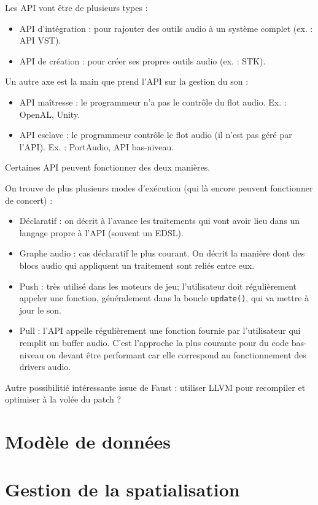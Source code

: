 \documentclass[french,12pt,a4paper]{article}
\begin{document}
Les API vont être de plusieurs types : 
\begin{itemize}
\item API d'intégration : pour rajouter des outils audio à un système complet (ex. : API VST).
\item API de création : pour créer ses propres outils audio (ex. : STK).
\end{itemize}

Un autre axe est la main que prend l'API sur la gestion du son : 
\begin{itemize}
\item API maîtresse : le programmeur n'a pas le contrôle du flot audio. Ex. : OpenAL, Unity.
\item API esclave : le programmeur contrôle le flot audio (il n'est pas géré par l'API). Ex. : PortAudio, API bas-niveau.
\end{itemize}

Certaines API peuvent fonctionner des deux manières.

On trouve de plus plusieurs modes d'exécution (qui là encore peuvent fonctionner de concert) : 
\begin{itemize}    
    \item Déclaratif : on décrit à l'avance les traitements qui vont avoir lieu dans un langage propre à l'API (souvent un \ac{EDSL}).
    \item Graphe audio : cas déclaratif le plus courant.
    On décrit la manière dont des blocs audio qui appliquent un traitement sont reliés entre eux. 
    \item Push : très utilisé dans les moteurs de jeu; l'utilisateur doit régulièrement appeler une fonction, 
    généralement dans la boucle \lstinline{update()}, qui va mettre à jour le son.
    \item Pull : l'API appelle régulièrement une fonction fournie par l'utilisateur qui remplit un buffer audio.
C'est l'approche la plus courante pour du code bas-niveau ou devant être performant car elle correspond 
au fonctionnement des drivers audio.
\end{itemize}


Autre possibilitié intéressante issue de Faust : utiliser LLVM pour recompiler et optimiser
à la volée du patch ?
\section{Modèle de données}
\section{Gestion de la spatialisation}
\end{document}
